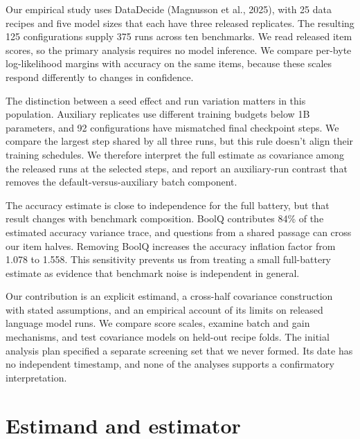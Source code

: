 \documentclass{article}
\begin{document}
Our empirical study uses DataDecide (Magnusson et al., 2025), with 25 data recipes and five model sizes that each have three released replicates. The resulting 125 configurations supply 375 runs across ten benchmarks. We read released item scores, so the primary analysis requires no model inference. We compare per-byte log-likelihood margins with accuracy on the same items, because these scales respond differently to changes in confidence.

The distinction between a seed effect and run variation matters in this population. Auxiliary replicates use different training budgets below 1B parameters, and 92 configurations have mismatched final checkpoint steps. We compare the largest step shared by all three runs, but this rule doesn't align their training schedules. We therefore interpret the full estimate as covariance among the released runs at the selected steps, and report an auxiliary-run contrast that removes the default-versus-auxiliary batch component.

The accuracy estimate is close to independence for the full battery, but that result changes with benchmark composition. BoolQ contributes 84\% of the estimated accuracy variance trace, and questions from a shared passage can cross our item halves. Removing BoolQ increases the accuracy inflation factor from 1.078 to 1.558. This sensitivity prevents us from treating a small full-battery estimate as evidence that benchmark noise is independent in general.

Our contribution is an explicit estimand, a cross-half covariance construction with stated assumptions, and an empirical account of its limits on released language model runs. We compare score scales, examine batch and gain mechanisms, and test covariance models on held-out recipe folds. The initial analysis plan specified a separate screening set that we never formed. Its date has no independent timestamp, and none of the analyses supports a confirmatory interpretation.

\section{Estimand and estimator}
\end{document}
